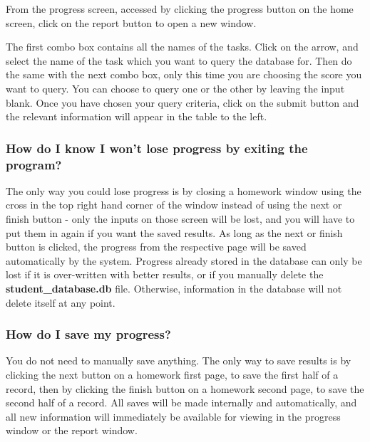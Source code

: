 From the progress screen, accessed by clicking the progress button on the home screen, click on the report button to open a new window.


The first combo box contains all the names of the tasks. Click on the arrow, and select the name of the task which you want to query the database for. Then do the same with the next combo box, only this time you are choosing the score you want to query. You can choose to query one or the other by leaving the input blank. Once you have chosen your query criteria, click on the submit button and the relevant information will appear in the table to the left.


\subsubsection{How do I know I won't lose progress by exiting the program?}

The only way you could lose progress is by closing a homework window using the cross in the top right hand corner of the window instead of using the next or finish button - only the inputs on those screen will be lost, and you will have to put them in again if you want the saved results. As long as the next or finish button is clicked, the progress from the respective page will be saved automatically by the system. Progress already stored in the database can only be lost if it is over-written with better results, or if you manually delete the \textbf{student\_database.db} file. Otherwise, information in the database will not delete itself at any point.


\subsubsection{How do I save my progress?}

You do not need to manually save anything. The only way to save results is by clicking the next button on a homework first page, to save the first half of a record, then by clicking the finish button on a homework second page, to save the second half of a record. All saves will be made internally and automatically, and all new information will immediately be available for viewing in the progress window or the report window.

